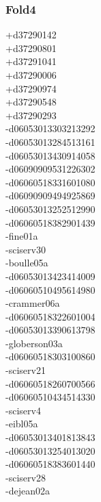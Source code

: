 \begin{multicols}{4}
\subsubsection*{Fold4}
+d37290142\\
+d37290801\\
+d37291041\\
+d37290006\\
+d37290974\\
+d37290548\\
+d37290293\\
-d06053013303213292\\
-d06053013284513161\\
-d06053013430914058\\
-d06090909531226302\\
-d06060518331601080\\
-d06090909494925869\\
-d06053013252512990\\
-d06060518382901439\\
-fine01a\\
-sciserv30\\
-boulle05a\\
-d06053013423414009\\
-d06060510495614980\\
-crammer06a\\
-d06060518322601004\\
-d06053013390613798\\
-globerson03a\\
-d06060518303100860\\
-sciserv21\\
-d06060518260700566\\
-d06060510434514330\\
-sciserv4\\
-eibl05a\\
-d06053013401813843\\
-d06053013254013020\\
-d06060518383601440\\
-sciserv28\\
-dejean02a\\

\end{multicols}
